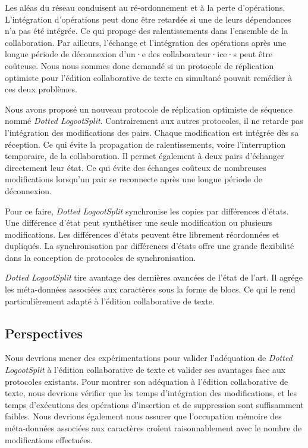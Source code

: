 Les aléas du réseau conduisent au ré-ordonnement et à la perte d'opérations.
L'intégration d'opérations peut donc être retardée si une de leurs dépendances n'a pas été intégrée.
Ce qui propage des ralentissements dans l'ensemble de la collaboration.
Par ailleurs, l'échange et l'intégration des opérations après une longue période de déconnexion d'un·e des collaborateur·ice·s peut être coûteuse.
Nous nous sommes donc demandé si un protocole de réplication optimiste pour l'édition collaborative de texte en simultané pouvait remédier à ces deux problèmes.

Nous avons proposé un nouveau protocole de réplication optimiste de séquence nommé \emph{Dotted LogootSplit}.
Contrairement aux autres protocoles, il ne retarde pas l'intégration des modifications des pairs.
Chaque modification est intégrée dès sa réception.
Ce qui évite la propagation de ralentissements, voire l'interruption temporaire, de la collaboration.
Il permet également à deux pairs d'échanger directement leur état.
Ce qui évite des échanges coûteux de nombreuses modifications lorsqu'un pair se reconnecte après une longue période de déconnexion.

Pour ce faire, \emph{Dotted LogootSplit} synchronise les copies par différences d'états.
Une différence d'état peut synthétiser une seule modification ou plusieurs modifications.
Les différences d'états peuvent être librement réordonnées et dupliqués.
La synchronisation par différences d'états offre une grande flexibilité dans la conception de protocoles de synchronisation.

\emph{Dotted LogootSplit} tire avantage des dernières avancées de l'état de l'art.
Il agrége les méta-données associées aux caractères sous la forme de blocs.
Ce qui le rend particulièrement adapté à l'édition collaborative de texte.

\subsection{Perspectives}

Nous devrions mener des expérimentations pour valider l'adéquation de \emph{Dotted LogootSplit} à l'édition collaborative de texte et valider ses avantages face aux protocoles existants.
Pour montrer son adéquation à l'édition collaborative de texte, nous devrions vérifier que les temps d'intégration des modifications, et les temps d'exécutions des opérations d'insertion et de suppression sont suffisamment faibles.
Nous devrions également nous assurer que l'occupation mémoire des méta-données associées aux caractères croîent raisonnablement avec le nombre de modifications effectuées.

